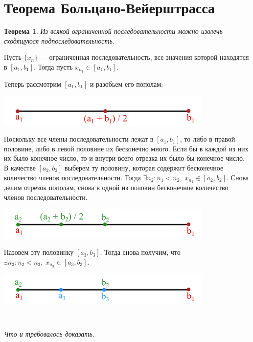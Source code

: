 \documentclass[a4paper,12pt,oneside]{extbook}
\newcommand{\newpar}{$ $\par\nobreak\ignorespaces}
\theoremstyle{numbered}
\theoremstyle{unnumbered}
\newtheorem*{theorem*}{Теорема}
\theoremstyle{named}
\theoremstyle{unnumbered}
\theoremstyle{named}
\theoremstyle{named}
\theoremstyle{named}
\renewenvironment{proof}[1][]{\breakenv[Доказательство]{\if\relax\detokenize{#1}\relax\else\;\fi}{\textbf{#1}}}{\smallskip\newpar \hfill\textit{Что и требовалось доказать.}}
\begin{document}
\section{Теорема Больцано-Вейерштрасса}%
\label{sec:Теорема Больцано-Вейерштрасса}

\begin{theorem*}
    Из всякой ограниченной последовательности можно извлечь сходящуюся подпоследовательность.
\end{theorem*}

\begin{proof}
    Пусть \(\{x_n\}\) — ограниченная последовательность, все значения которой находятся в \([a_1, b_1]\). Тогда пусть \(x_{n_1} \in [a_1, b_1]\).

    Теперь рассмотрим \([a_1, b_1]\) и разобьем его пополам:
    \begin{center}
        \includegraphics[width=0.8\textwidth]{veir1.png}
    \end{center}

    Поскольку все члены последовательности лежат в \([a_1, b_1]\), то либо в правой половине, либо в левой половине их бесконечно много. Если бы в каждой из них их было конечное число, то и внутри всего отрезка их было бы конечное число. В качестве \([a_2, b_2]\) выберем ту половину, которая содержит бесконечное количество членов последовательности. Тогда \(\exists n_2: n_1 < n_2, \; x_{n_2} \in [a_2, b_2]\). Снова делим отрезок пополам, снова в одной из половин бесконечное количество членов последовательности.

    \begin{center}
        \includegraphics[width=0.8\textwidth]{veir2.png}
    \end{center}

    Назовем эту половинку \([a_3, b_3]\). Тогда снова получим, что \(\exists n_3: n_2 < n_3, \; x_{n_3} \in [a_3, b_3]\).

    \begin{center}
        \includegraphics[width=0.8\textwidth]{veir3.png}
    \end{center}


\end{proof}
\end{document}
